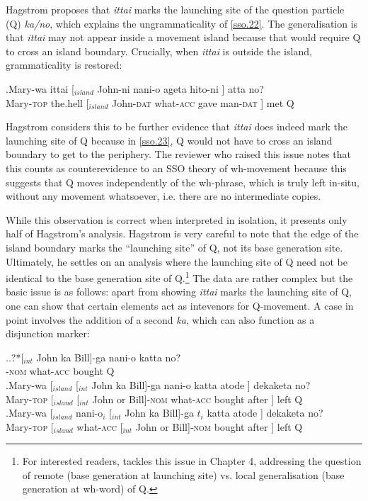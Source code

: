 \documentclass[charis]{glossa}
\begin{document}
Hagstrom proposes that \textit{ittai} marks the launching site of the question particle (Q) \textit{ka/no}, which explains the ungrammaticality of \ref{sso.22}. The generalisation is that \textit{ittai} may not appear inside a movement island because that would require Q to cross an island boundary. Crucially, when \textit{ittai} is outside the island, grammaticality is restored:

\exg.\label{sso.23}Mary-wa ittai [$_{island}$ John-ni nani-o ageta hito-ni ] atta no?\\
   Mary-\textsc{top} the.hell [$_{island}$ John-\textsc{dat} what-\textsc{acc} gave man-\textsc{dat} ] met Q\\

Hagstrom considers this to be further evidence that \textit{ittai} does indeed mark the launching site of Q because in \ref{sso.23}, Q would not have to cross an island boundary to get to the periphery. The reviewer who raised this issue notes that this counts as counterevidence to an SSO theory of wh-movement because this suggests that Q moves independently of the wh-phrase, which is truly left in-situ, without any movement whatsoever, i.e. there are no intermediate copies.

While this observation is correct when interpreted in isolation, it presents only half of Hagstrom's analysis. Hagstrom is very careful to note that the edge of the island boundary marks the ``launching site'' of Q, not its base generation site. Ultimately, he settles on an analysis where the launching site of Q need not be identical to the base generation site of Q.\footnote{For interested readers, \cite{hagstrom:1998} tackles this issue in Chapter 4, addressing the question of remote (base generation at launching site) vs. local generalisation (base generation at wh-word) of Q.} The data are rather complex but the basic issue is as follows: apart from showing \textit{ittai} marks the launching site of Q, one can show that certain elements act as intevenors for Q-movement. A case in point involves the addition of a second \textit{ka}, which can also function as a disjunction marker:

\ex.\ag.?*\label{sso.24a}[$_{int}$ John ka Bill]-ga nani-o katta no?\\
      [$_{int}$ John or Bill]-\textsc{nom} what-\textsc{acc} bought Q\\
   \bg.\label{sso.24b}Mary-wa [$_{island}$ [$_{int}$ John ka Bill]-ga nani-o katta atode ] dekaketa no?\\
      Mary-\textsc{top} [$_{island}$ [$_{int}$ John or Bill]-\textsc{nom} what-\textsc{acc} bought after ] left Q\\
   \bg.\label{sso.24c}Mary-wa [$_{island}$ nani-o$_i$ [$_{int}$ John ka Bill]-ga $t_i$ katta atode ] dekaketa no?\\
      Mary-\textsc{top} [$_{island}$ what-\textsc{acc} [$_{int}$ John or Bill]-\textsc{nom} {} bought after ] left Q\\
\end{document}

